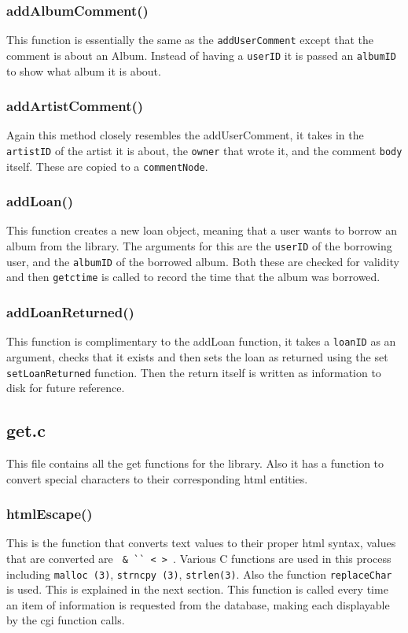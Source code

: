 \documentclass{article}
\begin{document}
\subsubsection*{addAlbumComment()}
This function is essentially the same as the \verb|addUserComment| except that the comment is about an Album. Instead of having a \verb|userID| it is passed an \verb|albumID| to show what album it is about.

\subsubsection*{addArtistComment()}
Again this method closely resembles the addUserComment, it takes in the \verb|artistID| of the artist it is about, the \verb|owner| that wrote it, and the comment \verb|body| itself. These are copied to a \verb|commentNode|.

\subsubsection*{addLoan()}
This function creates a new loan object, meaning that a user wants to borrow an album from the library. The arguments for this are the \verb|userID| of the borrowing user, and the \verb|albumID| of the borrowed album. Both these are checked for validity and then \verb|getctime| is called to record the time that the album was borrowed.

\subsubsection*{addLoanReturned()}
This function is complimentary to the addLoan function, it takes a \verb|loanID| as an argument, checks that it exists and then sets the loan as returned using the set \verb|setLoanReturned| function. Then the return itself is written as information to disk for future reference.

\subsection{get.c}
This file contains all the get functions for the library. Also it has a function to convert special characters to their corresponding html entities.

\subsubsection*{htmlEscape()}
This is the function that converts text values to their proper html syntax, values that are converted are \verb| & `` < > |. Various C functions are used in this process including \verb|malloc (3)|, \verb|strncpy (3)|, \verb|strlen(3)|. Also the function \verb|replaceChar| is used. This is explained in the next section. This function is called every time an item of information is requested from the database, making each displayable by the cgi function calls.
\end{document}
